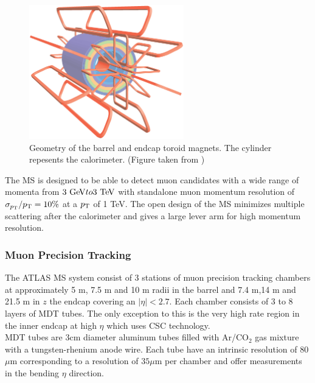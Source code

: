 \begin{figure}[h!]
\centering
\includegraphics[width=0.60\textwidth, angle=270]{figures/LHC_ATLAS/ATLcoilGeom.eps}
\caption{ Geometry of the barrel and endcap toroid magnets. The cylinder repesents the calorimeter. (Figure taken from \cite{ATLAS_JINST}) \label{LHC:fig:ATLASMag}}
\end{figure}

\indent The MS is designed to be able to detect muon candidates with a wide range of momenta from $3 \gev to 3 \tev$ with standalone muon momentum resolution of $\sigma_{p_{\mathrm{T}}}/p_{\mathrm{T}} = 10\%$ at a $p_{\mathrm{T}}$ of 1 TeV.  The open design of the MS minimizes multiple scattering after the calorimeter and gives a large lever arm for high momentum resolution. \\

\subsubsection*{Muon Precision Tracking}

\indent The ATLAS MS system consist of 3 stations of muon precision tracking chambers at approximately 5 m, 7.5 m and 10 m radii in the barrel and 7.4 m,14 m and 21.5 m in $z$ the endcap covering an $|\eta| < 2.7$.  Each chamber consists of 3 to 8 layers of MDT tubes.  The only exception to this is the very high rate region in the inner endcap at high $\eta$ which uses CSC technology.\\

\indent  MDT tubes are 3cm diameter aluminum tubes filled with Ar/CO$_2$ gas mixture with a tungsten-rhenium anode wire.  Each tube have an intrinsic resolution of 80 $\mu$m corresponding to a resolution of $35 \mu$m per chamber and offer measurements in the bending $\eta$ direction.  \\

